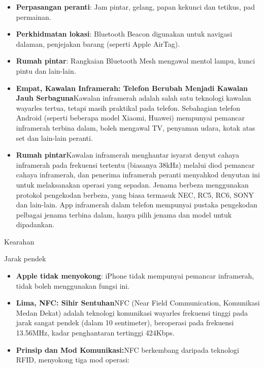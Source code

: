 \begin{itemize}
  \item \textbf{Perpasangan peranti}: Jam pintar, gelang, papan kekunci dan tetikus, pad permainan.
  \item \textbf{Perkhidmatan lokasi}: Bluetooth Beacon digunakan untuk navigasi dalaman, penjejakan barang (seperti Apple AirTag).
  \item \textbf{Rumah pintar}: Rangkaian Bluetooth Mesh mengawal mentol lampu, kunci pintu dan lain-lain.
  \item \textbf{Empat, Kawalan Inframerah: Telefon Berubah Menjadi Kawalan Jauh Serbaguna}Kawalan inframerah adalah salah satu teknologi kawalan wayarles tertua, tetapi masih praktikal pada telefon. Sebahagian telefon Android (seperti beberapa model Xiaomi, Huawei) mempunyai pemancar inframerah terbina dalam, boleh mengawal TV, penyaman udara, kotak atas set dan lain-lain peranti.
  \item \textbf{Rumah pintar}Kawalan inframerah menghantar isyarat denyut cahaya inframerah pada frekuensi tertentu (biasanya 38kHz) melalui diod pemancar cahaya inframerah, dan penerima inframerah peranti menyahkod denyutan ini untuk melaksanakan operasi yang sepadan. Jenama berbeza menggunakan protokol pengekodan berbeza, yang biasa termasuk NEC, RC5, RC6, SONY dan lain-lain. App inframerah dalam telefon mempunyai pustaka pengekodan pelbagai jenama terbina dalam, hanya pilih jenama dan model untuk dipadankan.
\end{itemize}


Kearahan


Jarak pendek


\begin{itemize}
  \item \textbf{Apple tidak menyokong}: iPhone tidak mempunyai pemancar inframerah, tidak boleh menggunakan fungsi ini.
  \item \textbf{Lima, NFC: Sihir Sentuhan}NFC (Near Field Communication, Komunikasi Medan Dekat) adalah teknologi komunikasi wayarles frekuensi tinggi pada jarak sangat pendek (dalam 10 sentimeter), beroperasi pada frekuensi 13.56MHz, kadar penghantaran tertinggi 424Kbps.
  \item \textbf{Prinsip dan Mod Komunikasi:}NFC berkembang daripada teknologi RFID, menyokong tiga mod operasi:
\end{itemize}


